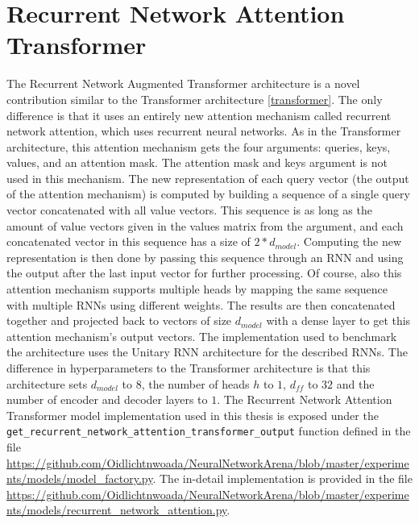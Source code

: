 \documentclass[draft,final]{vutinfth} %
\begin{document}
    \section{Recurrent Network Attention Transformer} \label{rnatt}
    The Recurrent Network Augmented Transformer architecture is a novel contribution similar to the Transformer architecture \ref{transformer}.
    The only difference is that it uses an entirely new attention mechanism called recurrent network attention, which uses recurrent neural networks.
    As in the Transformer architecture, this attention mechanism gets the four arguments: queries, keys, values, and an attention mask.
    The attention mask and keys argument is not used in this mechanism.
    The new representation of each query vector (the output of the attention mechanism) is computed by building a sequence of a single query vector concatenated with all value vectors.
    This sequence is as long as the amount of value vectors given in the values matrix from the argument, and each concatenated vector in this sequence has a size of $2*d_{model}$.
    Computing the new representation is then done by passing this sequence through an RNN and using the output after the last input vector for further processing.
    Of course, also this attention mechanism supports multiple heads by mapping the same sequence with multiple RNNs using different weights.
    The results are then concatenated together and projected back to vectors of size $d_{model}$ with a dense layer to get this attention mechanism's output vectors.
    The implementation used to benchmark the architecture uses the Unitary RNN architecture for the described RNNs.
    The difference in hyperparameters to the Transformer architecture is that this architecture sets $d_{model}$ to $8$, the number of heads $h$ to $1$, $d_{ff}$ to $32$ and the number of encoder and decoder layers to $1$.
    The Recurrent Network Attention Transformer model implementation used in this thesis is exposed under the \texttt{get\_recurrent\_network\_attention\_transformer\_output} function defined in the file \url{https://github.com/Oidlichtnwoada/NeuralNetworkArena/blob/master/experiments/models/model_factory.py}.
    The in-detail implementation is provided in the file \url{https://github.com/Oidlichtnwoada/NeuralNetworkArena/blob/master/experiments/models/recurrent_network_attention.py}.
\end{document}
